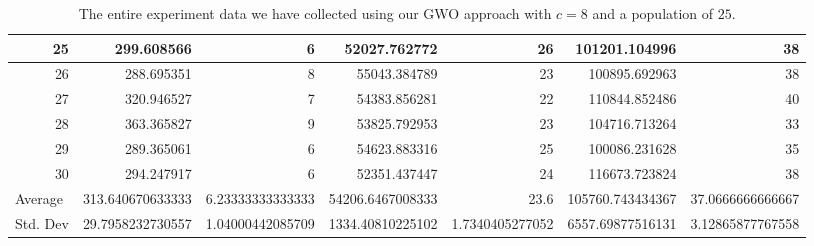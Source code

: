 \begin{table}
\begin{adjustwidth}{}{}
{{\begin{tabular}{|r|r|r|r|r|r|r|}
\hline
25                                         & 299.608566                   & 6                                     & 52027.762772                   & 26                                    & 101201.104996                & 38                                     \\ 
\hline
26                                         & 288.695351                   & 8                                     & 55043.384789                   & 23                                    & 100895.692963                & 38                                     \\ 
\hline
27                                         & 320.946527                   & 7                                     & 54383.856281                   & 22                                    & 110844.852486                & 40                                     \\ 
\hline
28                                         & 363.365827                   & 9                                     & 53825.792953                   & 23                                    & 104716.713264                & 33                                     \\ 
\hline
29                                         & 289.365061                   & 6                                     & 54623.883316                   & 25                                    & 100086.231628                & 35                                     \\ 
\hline
30                                         & 294.247917                   & 6                                     & 52351.437447                   & 24                                    & 116673.723824                & 38                                     \\ 
\hline
\multicolumn{1}{|l|}{Average}              & 313.640670633333             & 6.23333333333333                      & 54206.6467008333               & 23.6                                  & 105760.743434367             & 37.0666666666667                       \\ 
\hline
\multicolumn{1}{|l|}{Std. Dev}             & 29.7958232730557             & 1.04000442085709                      & 1334.40810225102               & 1.7340405277052                       & 6557.69877516131             & 3.12865877767558                       \\
\hline
\end{tabular}}}
\end{adjustwidth}
\caption{The entire experiment data we have collected using our GWO approach with $c = 8$ and a population of $25$.}
\label{full-data-gwo-c8-p25}
\end{table}

